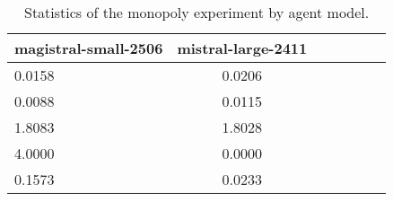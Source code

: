\begin{table}[H]
\caption{Statistics of the monopoly experiment by agent model.}
\label{tab:monopoly_stats}
\begin{tabular}{lcccccc}
\toprule
magistral-small-2506 & mistral-large-2411 \\
\midrule
0.0158 & 0.0206 \\
0.0088 & 0.0115 \\
1.8083 & 1.8028 \\
4.0000 & 0.0000 \\
0.1573 & 0.0233 \\
\bottomrule
\end{tabular}
\end{table}
